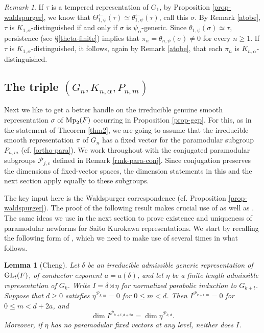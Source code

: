 \documentclass[12pt]{amsart}
\newtheorem{lemma}[theorem]{Lemma}%
\theoremstyle{definition}
\theoremstyle{remark}
\newtheorem{remark}{Remark}
\begin{document}
\begin{remark}\label{rmk-tempered}
If $\tau$ is a tempered representation of $G_1$, by Proposition \ref{prop-waldspurger}, we know that 
$\Theta^{\leftarrow}_{1,\psi}(\tau)
\simeq\theta^{\leftarrow}_{1,\psi}(\tau)$, call this $\sigma$. By Remark \ref{atobe}, $\tau$ is $K_{1,\alpha}$-distinguished if and only if $\sigma$ is $\psi_\alpha$-generic. Since $\theta_{1,\psi}(\sigma)\simeq\tau$, persistence (see \S \ref{theta-finite})  implies that $\pi_n=\theta_{n,\psi}(\sigma)\neq 0$ for every $n\geq1$. If $\tau$ is $K_{1,\alpha}$-distinguished, it follows, again by Remark \ref{atobe}, that each $\pi_n$ is $K_{n,\alpha}$-distinguished.
\end{remark}

\subsection{The triple $(G_n,K_{n,\alpha},P_{n,m})$}\label{prelim-thm2-cont}

Next we like to get a better handle on the irreducible genuine smooth representation $\sigma$ of ${\rm Mp}_2(F)$ occurring in Proposition \ref{prop-ggp}. For this, as in the statement of Theorem \ref{thm2}, we are going to assume that the irreducible smooth representation $\pi$ of $G_n$ has a fixed vector for the paramodular subgroup $P_{n,m}$ (cf. \ref{ortho-para}).
We work throughout with the conjugated paramodular subgroups $\mathcal P_{j,c}$ defined in Remark \ref{rmk-para-conj}. Since conjugation preserves the dimensions of fixed-vector spaces, the dimension statements in this and the next section apply equally to these subgroups.

The key input here is the Waldspurger correspondence (cf. Proposition \ref{prop-waldspurger}). The proof of the following result makes crucial use of \cite[Proposition 3.2]{gt16} as well as \cite[Lemma 6.1]{che26}. The same ideas we use in the next section to prove existence and uniqueness of paramodular newforms for Saito Kurokawa representations. We start by recalling the following form of \cite[Lemma 6.1]{che26}, which we need to make use of several times in what follows.

\begin{lemma}[Cheng]\label{lemma-cheng}
Let $\delta$ be an irreducible admissible generic representation of ${\rm GL}_t(F)$, of conductor exponent $a=a(\delta)$, and let $\eta$ be a finite length admissible representation of $G_k$. Write
$
I=\delta\rtimes\eta
$
for normalized parabolic induction to $G_{k+t}$. Suppose that $d\geq0$ satisfies
$
\eta^{\mathcal P_{k,m}}=0$ for $0\leq m<d$. 
Then
$
I^{\mathcal P_{k+t,m}}=0$ for $0\leq m<d+2a$, 
and
\[
\dim I^{\mathcal P_{k+t,d+2a}}
=
\dim\eta^{\mathcal P_{k,d}}.
\]
Moreover, if $\eta$ has no paramodular fixed vectors at any level, neither does $I$.
\end{lemma}
\end{document}
